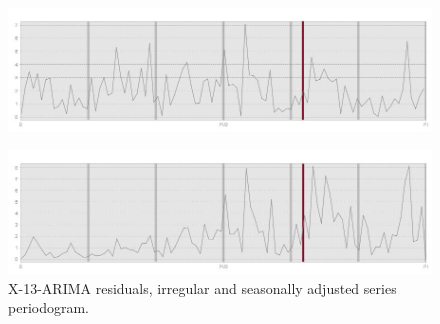 \documentclass[english,blauw]{cbsdiscussionpaper}
\begin{document}
\begin{figure}[h]
\includegraphics[width=\linewidth]{../images/capitolo3/XperIRR.jpg} 
\end{figure}
\begin{figure}[!h]
\includegraphics[width=\linewidth]{../images/capitolo3/XperSA.jpg} 
\caption{X-13-ARIMA residuals, irregular and seasonally adjusted series periodogram.}
\label{fig:X13per}
\end{figure}
\end{document}
